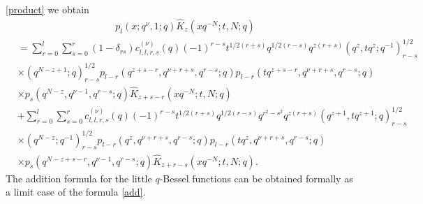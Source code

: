 \documentclass[12pt,a4paper]{amsart}
\numberwithin{equation}{section}
\theoremstyle{plain}
\theoremstyle{definition}
\theoremstyle{remark}
\numberwithin{equation}{section}
\numberwithin{table}{section}
\numberwithin{figure}{section}
\begin{document}
\eqref{product} we obtain
\begin{align}
&p_{l}(x;q^{\nu},1;q)\widehat{K}_{z}(xq^{-N};t,N;q) \label{add}
\end{align}
\begin{align*}&=\sum_{r=0}^{l}\sum_{s=0}^{r}(1-\delta_{rs})c_{l,l,r,s}^{(\nu)}(q)
(-1)^{r-s}t^{1/2(r+s)}q^{1/2(r-s)}q^{z(r+s)}(q^z,tq^z;q^{-1})_{r-s}^{1/2}\\&
 \times
(q^{N-z+1};q)_{r-s}^{1/2}
p_{l-r}(q^{z+s-r},q^{\nu+r+s},q^{r-s};q)p_{l-r}(tq^{z+s-r},q^{\nu+r+s},q^{r-s};q)\\&
\times
p_{s}(q^{N-z},q^{\nu-1},q^{r-s};q)\widehat{K}_{z+s-r}(xq^{-N};t,N;q)\\&+\sum_{r=0}^{l}\sum_{s=0}^{r}c_{l,l,r,s}^{(\nu)}(q)
(-1)^{r-s}t^{1/2(r+s)}q^{1/2(r-s)}q^{r^2-s^2}q^{z(r+s)}(q^{z+1},tq^{z+1};q)_{r-s}^{1/2}\\&\times
(q^{N-z};q^{-1})_{r-s}^{1/2}
p_{l-r}(q^{z},q^{\nu+r+s},q^{r-s};q)p_{l-r}(tq^{z},q^{\nu+r+s},q^{r-s};q)\\&\times
p_{s}(q^{N-z+s-r},q^{\nu-1},q^{r-s};q)\widehat{K}_{z+r-s}(xq^{-N};t,N;q).
\end{align*}
The addition formula for the little $q$-Bessel functions can be
obtained formally as a limit case of the formula \eqref{add}.
\end{document}
